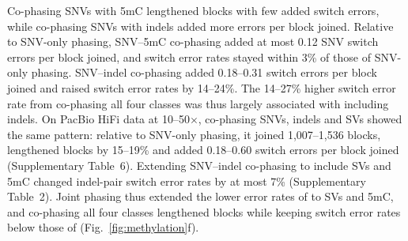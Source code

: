 Co-phasing SNVs with 5mC lengthened blocks with few added switch errors, while co-phasing SNVs with indels added more errors per block joined. Relative to SNV-only phasing, SNV--5mC co-phasing added at most 0.12 SNV switch errors per block joined, and switch error rates stayed within 3\% of those of SNV-only phasing. SNV--indel co-phasing added 0.18--0.31 switch errors per block joined and raised switch error rates by 14--24\%. The 14--27\% higher switch error rate from co-phasing all four classes was thus largely associated with including indels. On PacBio HiFi data at 10--50$\times$, co-phasing SNVs, indels and SVs showed the same pattern: relative to SNV-only phasing, it joined 1,007--1,536 blocks, lengthened blocks by 15--19\% and added 0.18--0.60 switch errors per block joined (Supplementary Table~6). Extending SNV--indel co-phasing to include SVs and 5mC changed indel-pair switch error rates by at most 7\% (Supplementary Table~2). Joint phasing thus extended the lower error rates of \toolname to SVs and 5mC, and co-phasing all four classes lengthened blocks while keeping switch error rates below those of \whatshap (Fig.~\ref{fig:methylation}f).


